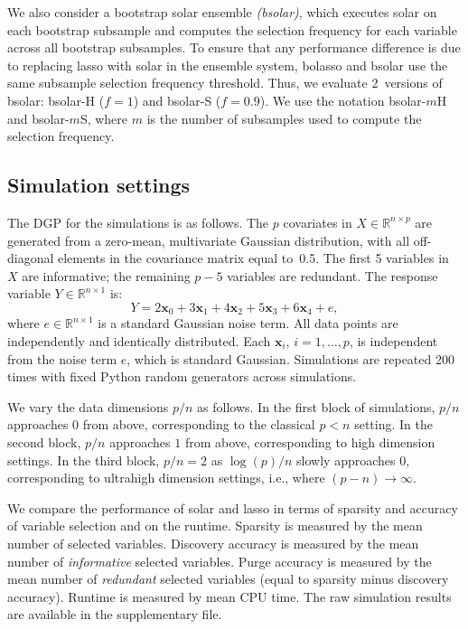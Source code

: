 \documentclass[11pt,review,authoryear]{elsarticle}
\begin{document}
We also consider a bootstrap solar ensemble \emph{(bsolar)}, which executes solar on each bootstrap subsample and computes the selection frequency for each variable across all bootstrap subsamples. To ensure that any performance difference is due to replacing lasso with solar in the ensemble system, bolasso and bsolar use the same subsample selection frequency threshold. Thus, we evaluate 2~versions of bsolar: bsolar-H ($f=1$) and bsolar-S ($f=0.9$). We use the notation bsolar-$m$H and bsolar-$m$S, where $m$ is the number of subsamples used to compute the selection frequency.

\subsection{Simulation settings}

The DGP for the simulations is as follows. The $p$ covariates in $X \in \mathbb{R}^{n \times p}$ are generated from a zero-mean, multivariate Gaussian distribution, with all off-diagonal elements in the covariance matrix equal to~0.5. The first 5 variables in $X$ are informative; the remaining $p-5$ variables are redundant. The response variable $Y \in \mathbb{R}^{n \times 1}$ is:
%
\begin{equation}
%
  Y =  2 \mathbf{x}_0 + 3 \mathbf{x}_1 + 4 \mathbf{x}_2 + 5 \mathbf{x}_3 + 6 \mathbf{x}_4  + e,
  \label{eqn:pop_model}
\end{equation}
%
where $e\in \mathbb{R}^{n \times 1}$ is a standard Gaussian noise term. All data points are independently and identically distributed. Each $\mathbf{x}_i$, $i=1,\ldots,p$, is independent from the noise term $e$, which is standard Gaussian. Simulations are repeated 200 times with fixed Python random generators across simulations.

We vary the data dimensions $p/n$ as follows. In the first block of simulations, $p/n$ approaches $0$ from above, corresponding to the classical $p<n$ setting. In the second block, $p/n$ approaches $1$ from above, corresponding to high dimension settings. In the third block, $p/n=2$ as $\log(p)/n$ slowly approaches $0$, corresponding to ultrahigh dimension settings, i.e., where $(p-n)\rightarrow\infty$.

We compare the performance of solar and lasso in terms of sparsity and accuracy of variable selection and on the runtime. Sparsity is measured by the mean number of selected variables. Discovery accuracy is measured by the mean number of \emph{informative} selected variables. Purge accuracy is measured by the mean number of \emph{redundant} selected variables (equal to sparsity minus discovery accuracy). Runtime is measured by mean CPU time.  The raw simulation results are available in the supplementary file.
\end{document}
